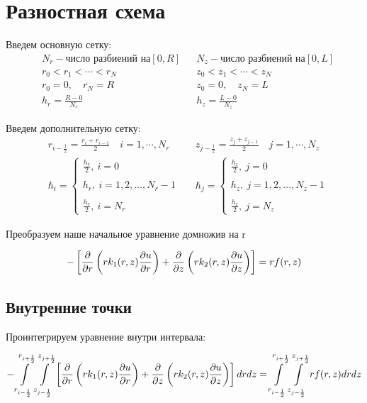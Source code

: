 \section{Разностная схема}
Введем основную сетку:
\begin{align*}
  &N_r - \text{число разбиений на} [0, R] & &N_z - \text{число разбиений на} [0, L] \\
  &r_0 < r_1 < \cdots < r_N & &z_0 < z_1 < \cdots < z_N \\
  &r_0 = 0,\quad r_N = R & &z_0 = 0,\quad z_N = L \\
  &h_r = \frac{R - 0}{N_r} & &h_z = \frac{L - 0}{N_z}
\end{align*}

Введем дополнительную сетку:
\begin{align*}
  &r_{i-\frac{1}{2}} = \frac{r_i + r_{i - 1}}{2}\quad i=1,\cdots, N_r & &z_{j-\frac{1}{2}} = \frac{z_j + z_{j - 1}}{2}\quad j=1,\cdots, N_z \\
  & \hbar_i = \begin{cases}
    \frac{h_r}{2},\ i = 0 \\ \\
    h_r,\ i = 1, 2, \dots, N_r-1 \\ \\
    \frac{h_r}{2},\ i = N_r
  \end{cases} &
  & \hbar_j = \begin{cases}
    \frac{h_z}{2},\ j = 0 \\ \\
    h_z,\ j = 1, 2, \dots, N_z-1 \\ \\
    \frac{h_z}{2},\ j = N_z
  \end{cases}
\end{align*}

Преобразуем наше начальное уравнение домножив на r

\[
  - \left [ \pdv{}{r} \left ( r k_1(r, z) \pdv{u}{r} \right ) 
  + \pdv{}{z} \left ( rk_2(r, z)\pdv{u}{z} \right ) \right ] = rf(r, z)
\]

\subsection{Внутренние точки}
Проинтегрируем уравнение внутри интервала:

\[
  - \int\limits^{r_{i +\frac{1}{2}}}_{r_{i -\frac{1}{2}}} \int\limits^{z_{j +\frac{1}{2}}}_{z_{j -\frac{1}{2}}} \left [ \pdv{}{r} \left ( r k_1(r, z) \pdv{u}{r} \right ) 
  + \pdv{}{z} \left ( rk_2(r, z)\pdv{u}{z} \right ) \right ] dr dz = \int\limits^{r_{i +\frac{1}{2}}}_{r_{i -\frac{1}{2}}} \int\limits^{z_{j +\frac{1}{2}}}_{z_{j -\frac{1}{2}}} rf(r, z) dr dz
\]


